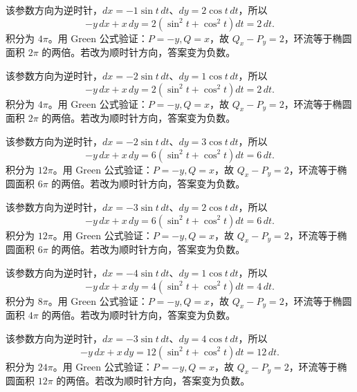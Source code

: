 \documentclass[UTF8,12pt,a4paper,fontset=fandol]{ctexart}
\begin{document}
\begin{solve}\label{ans:c41q8}
该参数方向为逆时针，$dx=-1\sin t\,dt$、$dy=2\cos t\,dt$，所以
\[
-y\,dx+x\,dy=2(\sin^2t+\cos^2t)dt=2\,dt.
\]
积分为 $4\pi$。用 Green 公式验证：$P=-y,Q=x$，故 $Q_x-P_y=2$，环流等于椭圆面积 $2\pi$ 的两倍。若改为顺时针方向，答案变为负数。
\end{solve}

\begin{solve}\label{ans:c41q9}
该参数方向为逆时针，$dx=-2\sin t\,dt$、$dy=1\cos t\,dt$，所以
\[
-y\,dx+x\,dy=2(\sin^2t+\cos^2t)dt=2\,dt.
\]
积分为 $4\pi$。用 Green 公式验证：$P=-y,Q=x$，故 $Q_x-P_y=2$，环流等于椭圆面积 $2\pi$ 的两倍。若改为顺时针方向，答案变为负数。
\end{solve}

\begin{solve}\label{ans:c41q10}
该参数方向为逆时针，$dx=-2\sin t\,dt$、$dy=3\cos t\,dt$，所以
\[
-y\,dx+x\,dy=6(\sin^2t+\cos^2t)dt=6\,dt.
\]
积分为 $12\pi$。用 Green 公式验证：$P=-y,Q=x$，故 $Q_x-P_y=2$，环流等于椭圆面积 $6\pi$ 的两倍。若改为顺时针方向，答案变为负数。
\end{solve}

\begin{solve}\label{ans:c41q11}
该参数方向为逆时针，$dx=-3\sin t\,dt$、$dy=2\cos t\,dt$，所以
\[
-y\,dx+x\,dy=6(\sin^2t+\cos^2t)dt=6\,dt.
\]
积分为 $12\pi$。用 Green 公式验证：$P=-y,Q=x$，故 $Q_x-P_y=2$，环流等于椭圆面积 $6\pi$ 的两倍。若改为顺时针方向，答案变为负数。
\end{solve}

\begin{solve}\label{ans:c41q12}
该参数方向为逆时针，$dx=-4\sin t\,dt$、$dy=1\cos t\,dt$，所以
\[
-y\,dx+x\,dy=4(\sin^2t+\cos^2t)dt=4\,dt.
\]
积分为 $8\pi$。用 Green 公式验证：$P=-y,Q=x$，故 $Q_x-P_y=2$，环流等于椭圆面积 $4\pi$ 的两倍。若改为顺时针方向，答案变为负数。
\end{solve}

\begin{solve}\label{ans:c41q13}
该参数方向为逆时针，$dx=-3\sin t\,dt$、$dy=4\cos t\,dt$，所以
\[
-y\,dx+x\,dy=12(\sin^2t+\cos^2t)dt=12\,dt.
\]
积分为 $24\pi$。用 Green 公式验证：$P=-y,Q=x$，故 $Q_x-P_y=2$，环流等于椭圆面积 $12\pi$ 的两倍。若改为顺时针方向，答案变为负数。
\end{solve}
\end{document}
